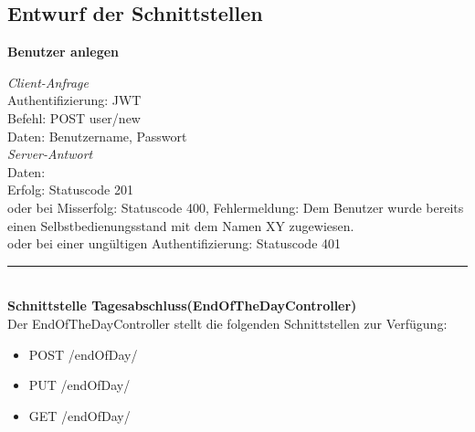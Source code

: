 \subsection *{Entwurf der Schnittstellen}\label{Schnittstellen}

\textbf{Benutzer anlegen}

\textit{Client-Anfrage}
\\
Authentifizierung: JWT\\
Befehl: POST user/new\\
Daten: Benutzername, Passwort\\

\textit{Server-Antwort}
\\
Daten:\\
Erfolg: Statuscode 201\\
oder bei Misserfolg: Statuscode 400, Fehlermeldung: Dem Benutzer wurde bereits einen  Selbstbedienungsstand mit dem Namen XY zugewiesen.\\
oder bei einer ungültigen Authentifizierung: Statuscode 401 

\noindent\rule{\textwidth}{1pt}
\\
\textbf{Schnittstelle Tagesabschluss(EndOfTheDayController)}
\\
Der EndOfTheDayController stellt die folgenden Schnittstellen zur Verfügung:

\begin{itemize}
	\itemsep0pt
	\item  POST /endOfDay/
	\item  PUT /endOfDay/
	\item  GET /endOfDay/
\end{itemize}


